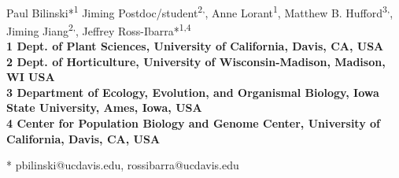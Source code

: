 \documentclass[10pt,letterpaper]{article}
\date{}
\begin{document}
\vspace*{0.35in}

\begin{flushleft}
{\Large
\textbf{}
}
\newline
\\
Paul Bilinski*\textsuperscript{1}%
Jiming Postdoc/student\textsuperscript{2,},
Anne Lorant\textsuperscript{1},
Matthew B. Hufford\textsuperscript{3,},
Jiming Jiang\textsuperscript{2,},
Jeffrey Ross-Ibarra*\textsuperscript{1,4}
\\
\bigskip
\bf{1} Dept. of Plant Sciences, University of California, Davis, CA, USA
\\
\bf{2} Dept. of Horticulture, University of Wisconsin-Madison, Madison, WI USA
\\
\bf{3} Department of Ecology, Evolution, and Organismal Biology, Iowa State University, Ames, Iowa, USA
\\
\bf{4} Center for Population Biology and Genome Center, University of California, Davis, CA, USA
\\
\bigskip

% 
%





* pbilinski@ucdavis.edu, rossibarra@ucdavis.edu

\end{flushleft}
\end{document}
